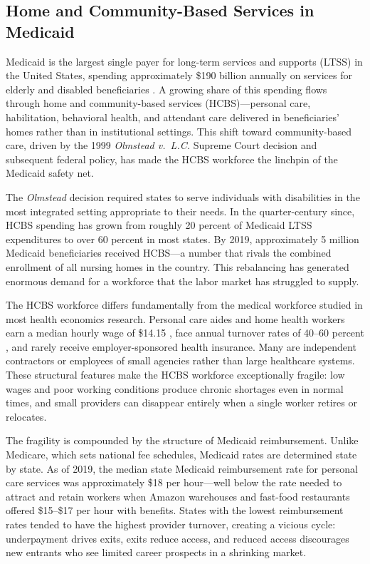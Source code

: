 \documentclass[12pt]{article}
\begin{document}
\subsection{Home and Community-Based Services in Medicaid}

Medicaid is the largest single payer for long-term services and supports (LTSS) in the United States, spending approximately \$190 billion annually on services for elderly and disabled beneficiaries \citep{cms2024medicaid}. A growing share of this spending flows through home and community-based services (HCBS)---personal care, habilitation, behavioral health, and attendant care delivered in beneficiaries' homes rather than in institutional settings. This shift toward community-based care, driven by the 1999 \emph{Olmstead v.\ L.C.} Supreme Court decision and subsequent federal policy, has made the HCBS workforce the linchpin of the Medicaid safety net.

The \emph{Olmstead} decision required states to serve individuals with disabilities in the most integrated setting appropriate to their needs. In the quarter-century since, HCBS spending has grown from roughly 20 percent of Medicaid LTSS expenditures to over 60 percent in most states. By 2019, approximately 5 million Medicaid beneficiaries received HCBS---a number that rivals the combined enrollment of all nursing homes in the country. This rebalancing has generated enormous demand for a workforce that the labor market has struggled to supply.

The HCBS workforce differs fundamentally from the medical workforce studied in most health economics research. Personal care aides and home health workers earn a median hourly wage of \$14.15 \citep{bls2023hcbs}, face annual turnover rates of 40--60 percent \citep{phi2023turnover}, and rarely receive employer-sponsored health insurance. Many are independent contractors or employees of small agencies rather than large healthcare systems. These structural features make the HCBS workforce exceptionally fragile: low wages and poor working conditions produce chronic shortages even in normal times, and small providers can disappear entirely when a single worker retires or relocates.

The fragility is compounded by the structure of Medicaid reimbursement. Unlike Medicare, which sets national fee schedules, Medicaid rates are determined state by state. As of 2019, the median state Medicaid reimbursement rate for personal care services was approximately \$18 per hour---well below the rate needed to attract and retain workers when Amazon warehouses and fast-food restaurants offered \$15--\$17 per hour with benefits. States with the lowest reimbursement rates tended to have the highest provider turnover, creating a vicious cycle: underpayment drives exits, exits reduce access, and reduced access discourages new entrants who see limited career prospects in a shrinking market.
\end{document}
